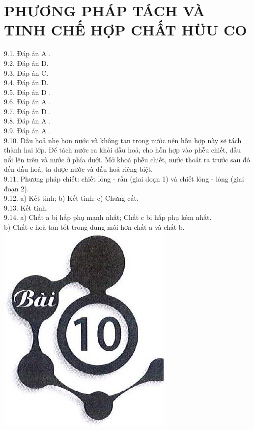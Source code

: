 \documentclass[10pt]{article}
\begin{document}
\section*{PHƯƠNG PHÁP TÁCH VÀ TINH CHẾ HỢP CHẤT HÜU CO}
9.1. Đáp án A .\\
9.2. Đáp án D.\\
9.3. Đáp án C.\\
9.4. Đáp án D.\\
9.5. Đáp án D .\\
9.6. Đáp án A .\\
9.7. Đáp án D .\\
9.8. Đáp án A .\\
9.9. Đáp án A .\\
9.10. Dầu hoả nhẹ hơn nước và không tan trong nước nên hỗn hợp này sẽ tách thành hai lớp. Để tách nước ra khỏi dầu hoả, cho hỗn hợp vào phễu chiết, dầu nổi lên trên và nước ở phía dưới. Mở khoá phễu chiết, nước thoát ra trước sau đó đến dầu hoả, ta được nước và dầu hoả riêng biệt.\\
9.11. Phương pháp chiết: chiết lỏng - rắn (giai đoạn 1) và chiết lỏng - lỏng (giai đoạn 2).\\
9.12. a) Kết tinh; b) Kết tinh; c) Chưng cất.\\
9.13. Kết tinh.\\
9.14. a) Chất a bị hấp phụ mạnh nhất; Chất c bị hấp phụ kém nhất.\\
b) Chất c hoà tan tốt trong dung môi hơn chất a và chất b.\\
\includegraphics[max width=\textwidth, center]{2025_10_23_adad5b98d65ac6665838g-14(1)}
\end{document}
